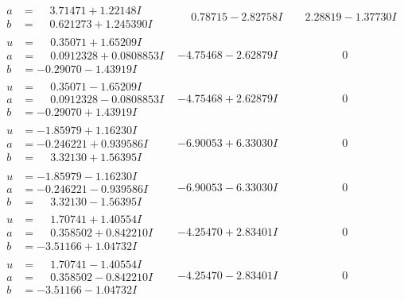 \documentclass[1p]{elsarticle_modified}
\theoremstyle{definition}
\begin{document}
$$\begin{array}{c|c|c}
\begin{aligned}
a &= \phantom{-}3.71471 + 1.22148 I \\
b &= \phantom{-}0.621273 + 1.245390 I\end{aligned}
 & \phantom{-}0.78715 - 2.82758 I & \phantom{-}2.28819 - 1.37730 I \\ \hline\begin{aligned}
u &= \phantom{-}0.35071 + 1.65209 I \\
a &= \phantom{-}0.0912328 + 0.0808853 I \\
b &= -0.29070 - 1.43919 I\end{aligned}
 & -4.75468 - 2.62879 I & \phantom{-0.000000 } 0 \\ \hline\begin{aligned}
u &= \phantom{-}0.35071 - 1.65209 I \\
a &= \phantom{-}0.0912328 - 0.0808853 I \\
b &= -0.29070 + 1.43919 I\end{aligned}
 & -4.75468 + 2.62879 I & \phantom{-0.000000 } 0 \\ \hline\begin{aligned}
u &= -1.85979 + 1.16230 I \\
a &= -0.246221 + 0.939586 I \\
b &= \phantom{-}3.32130 + 1.56395 I\end{aligned}
 & -6.90053 + 6.33030 I & \phantom{-0.000000 } 0 \\ \hline\begin{aligned}
u &= -1.85979 - 1.16230 I \\
a &= -0.246221 - 0.939586 I \\
b &= \phantom{-}3.32130 - 1.56395 I\end{aligned}
 & -6.90053 - 6.33030 I & \phantom{-0.000000 } 0 \\ \hline\begin{aligned}
u &= \phantom{-}1.70741 + 1.40554 I \\
a &= \phantom{-}0.358502 + 0.842210 I \\
b &= -3.51166 + 1.04732 I\end{aligned}
 & -4.25470 + 2.83401 I & \phantom{-0.000000 } 0 \\ \hline\begin{aligned}
u &= \phantom{-}1.70741 - 1.40554 I \\
a &= \phantom{-}0.358502 - 0.842210 I \\
b &= -3.51166 - 1.04732 I\end{aligned}
 & -4.25470 - 2.83401 I & \phantom{-0.000000 } 0 \\ \hline\begin{aligned}

\end{aligned}
\end{array}$$
\end{document}
